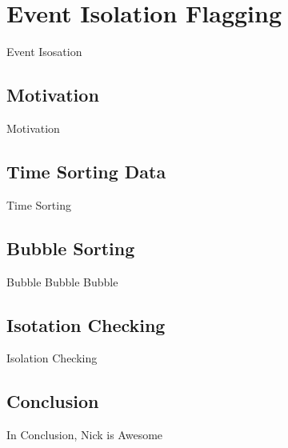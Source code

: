 \section{Event Isolation Flagging}
	
	Event Isosation

	\subsection{Motivation}

	Motivation

	\subsection{Time Sorting Data}

	Time Sorting

	\subsection{Bubble Sorting}

	Bubble Bubble Bubble

	\subsection{Isotation Checking}

	Isolation Checking 

	\subsection{Conclusion} 

	In Conclusion, Nick is Awesome